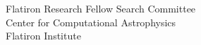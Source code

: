 \documentclass[12pt]{letter}
\begin{document}
\begin{letter}{
               Flatiron Research Fellow Search Committee \\
               Center for Computational Astrophysics \\
               Flatiron Institute 
           }


\end{letter}
\end{document}

